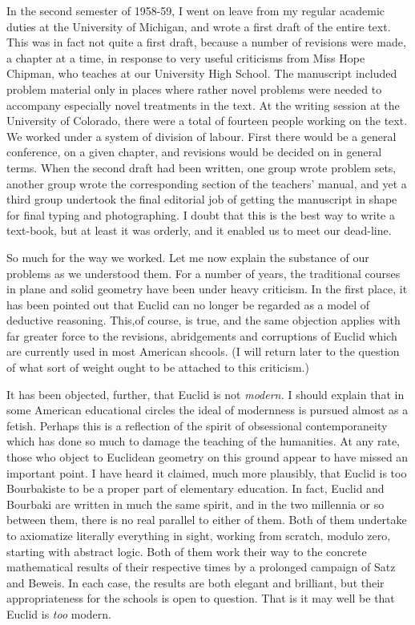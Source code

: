 In the second semester of 1958-59, I went on leave from my regular
academic duties at the University of Michigan, and wrote a first draft
of the entire text. This was in fact not quite a first draft, because
a number of revisions were made, a chapter at a time, in response to
very useful criticisms from Miss Hope Chipman, who teaches at our
University High School. The manuscript included problem material only
in places where rather novel problems were needed to accompany
especially novel treatments in the text. At the writing session at the
University of Colorado, there were a total of fourteen people working
on the text. We worked under a system of division of labour. First
there would be a general conference, on a given chapter, and revisions
would be decided on in general terms. When the second draft had been
written, one group wrote problem sets, another group wrote the
corresponding section of the teachers' manual, and yet a third group
undertook the final editorial job of getting the manuscript in shape
for final typing and photographing. I doubt that this is the best way
to write a text-book, but at least it was orderly, and it enabled us
to meet our dead-line.

So much for the way we worked. Let me now explain the substance of our
problems as we understood them. For a number of years, the traditional
courses in plane and solid geometry have been under heavy
criticism. In the first place, it has been pointed out that Euclid can
no longer be regarded as a model of deductive
reasoning. This,\pageoriginale of course, is true, and the same
objection applies with far greater force to the revisions,
abridgements and corruptions of Euclid which are currently used in
most American shcools. (I will return later to the question of what
sort of weight ought to be attached to this criticism.)


It has been objected, further, that Euclid is not \textit{modern.} I
should explain that in some American educational circles the ideal of
modernness is pursued almost as a fetish. Perhaps this is a reflection
of the spirit of obsessional contemporaneity which has done so much to
damage the teaching of the humanities. At any rate, those who object
to Euclidean geometry on this ground appear to have missed an
important point. I have heard it claimed, much more plausibly, that
Euclid is too Bourbakiste to be a proper part of elementary
education. In fact, Euclid and Bourbaki are written in much the same
spirit, and in the two millennia or so between them, there is no real
parallel to either of them. Both of them undertake to axiomatize
literally everything in sight, working from scratch, modulo zero,
starting with abstract logic. Both of them work their way to the
concrete mathematical results of their respective times by a prolonged
campaign of Satz and Beweis. In each case, the results are both
elegant and brilliant, but their appropriateness for the schools is
open to question. That is it may well be that Euclid is \textit{too}
modern.

